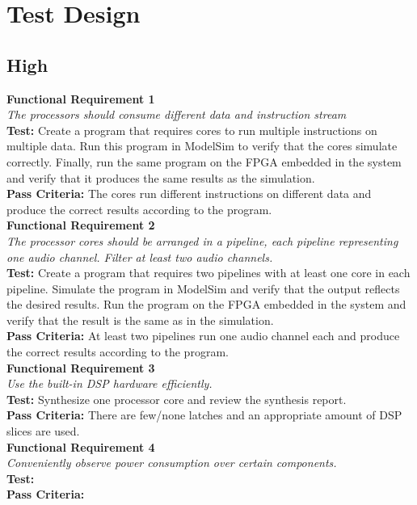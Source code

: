 \section{Test Design}

\subsection{High}

\textbf{Functional Requirement 1}
\\
\textit{The processors should consume different data and instruction stream}
\\
\textbf{Test:}
Create a program that requires cores to run multiple instructions on multiple data. 
Run this program in ModelSim to verify that the cores simulate correctly. 
Finally, run the same program on the FPGA embedded in the system and verify that it produces the same results as the simulation.
\\
\textbf{Pass Criteria:}
The cores run different instructions on different data and produce the correct results according to the program. 
\\

\textbf{Functional Requirement 2}
\\
\textit{The processor cores should be arranged in a pipeline, each pipeline representing one audio channel. Filter at least two audio channels.}
\\
\textbf{Test:}
Create a program that requires two pipelines with at least one core in each pipeline. 
Simulate the program in ModelSim and verify that the output reflects the desired results.
Run the program on the FPGA embedded in the system and verify that the result is the same as in the simulation.
\\
\textbf{Pass Criteria:}
At least two pipelines run one audio channel each and produce the correct results according to the program.
\\

\textbf{Functional Requirement 3}
\\
\textit{Use the built-in DSP hardware efficiently.}
\\
\textbf{Test:}
Synthesize one processor core and review the synthesis report. 
\\ 
\textbf{Pass Criteria:}
There are few/none latches and an appropriate amount of DSP slices are used.
\\


\textbf{Functional Requirement 4}
\\
\textit{Conveniently observe power consumption over certain components.}
\\
\textbf{Test:}
\\
\textbf{Pass Criteria:}
\\


